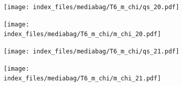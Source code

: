 \documentclass[
  11pt,
  letterpaper,
]{scrreprt}
\begin{document}
\begin{figure}

\begin{minipage}{0.50\linewidth}

\begin{figure}[H]

{\centering \texttt{[image: index\_files/mediabag/T6\_m\_chi/qs\_20.pdf]}

}


\end{figure}%

\end{minipage}%
%
\begin{minipage}{0.50\linewidth}

\begin{figure}[H]

{\centering \texttt{[image: index\_files/mediabag/T6\_m\_chi/m\_chi\_20.pdf]}

}


\end{figure}%

\end{minipage}%

\end{figure}%

\begin{figure}

\begin{minipage}{0.50\linewidth}

\begin{figure}[H]

{\centering \texttt{[image: index\_files/mediabag/T6\_m\_chi/qs\_21.pdf]}

}


\end{figure}%

\end{minipage}%
%
\begin{minipage}{0.50\linewidth}

\begin{figure}[H]

{\centering \texttt{[image: index\_files/mediabag/T6\_m\_chi/m\_chi\_21.pdf]}

}


\end{figure}%

\end{minipage}%

\end{figure}%
\end{document}
